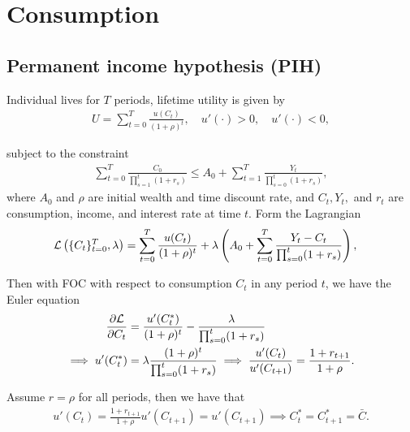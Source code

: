 \documentclass[../main.tex]{subfiles}
\begin{document}
    
    
    \chapter{Consumption}
    
    \section{Permanent income hypothesis (PIH)}
    
        Individual lives for $T$ periods, lifetime utility is given by
        \begin{align}
            U = \sum_{t=0}^T \frac{u(C_t)}{(1+\rho)^t}, \quad u'(\cdot) > 0, \quad u'(\cdot) < 0,
        \end{align}
        
        subject to the constraint
        \begin{align}
            \sum_{t=0}^T \frac{C_0}{\prod_{s=1}^{t} (1+r_s)}
            \le A_0 + \sum_{t=1}^T \frac{Y_t}{\prod_{s=0}^{t} (1+r_s)}, \label{eqn:constant-budget}
        \end{align}
        where $A_0$ and $\rho$ are initial wealth and time discount rate, and $C_t, Y_t,$ and $r_t$ are consumption, income, and interest rate at time $t$. Form the Lagrangian
        \begin{align}
            \mathcal{L}\left(\{C_t\}_{t=0}^{T}, \lambda\right)
            &= \sum_{t=0}^T
            \frac{u(C_t)}{(1+\rho)^t} + \lambda  \left(A_0 +\sum_{t=0}^T \frac{Y_t - C_t}{\prod_{s=0}^{t} (1+r_s)} \right),
        \end{align}
        
        Then with FOC with respect to consumption $C_t$ in any period $t$, we have the Euler equation
        \begin{align}
            \frac{\partial \mathcal{L}}{\partial C_t}
            &= \frac{u'(C_t^*)}{(1+\rho)^t} - \frac{\lambda}{\prod_{s=0}^t (1+r_s)}
            \\
            \implies u'(C_t^*) &= \lambda \frac{(1+\rho)^t}{\prod_{s=0}^t (1+r_s)}
            \implies
            \frac{u'(C_t)}{u'(C_{t+1})} = \frac{1+r_{t+1}}{1+\rho}.
        \end{align}
        
        Assume $r = \rho$ for all periods, then we have that        \begin{align}
            u'(C_t)
            = \frac{1+r_{t+1}}{1+\rho} u'(C_{t+1})
            = u'(C_{t+1})
            \implies
            C_t^* = C_{t+1}^* = \bar C.
        \end{align}
        
\end{document}
